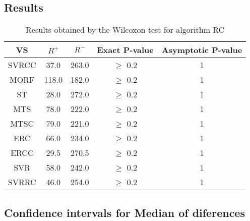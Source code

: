 \documentclass[a4paper,10pt]{article}
\begin{document}
\subsection{Results}

\begin{table}[!htp]
\centering\small
\begin{tabular}{
|c|c|c|c|c|}
\hline
 VS & $R^{+}$ & $R^{-}$ & Exact P-value & Asymptotic P-value \\ \hline 
SVRCC & 37.0 & 263.0 & $\geq$ 0.2 & 1\\ \hline 
MORF & 118.0 & 182.0 & $\geq$ 0.2 & 1\\ \hline 
ST & 28.0 & 272.0 & $\geq$ 0.2 & 1\\ \hline 
MTS & 78.0 & 222.0 & $\geq$ 0.2 & 1\\ \hline 
MTSC & 79.0 & 221.0 & $\geq$ 0.2 & 1\\ \hline 
ERC & 66.0 & 234.0 & $\geq$ 0.2 & 1\\ \hline 
ERCC & 29.5 & 270.5 & $\geq$ 0.2 & 1\\ \hline 
SVR & 58.0 & 242.0 & $\geq$ 0.2 & 1\\ \hline 
SVRRC & 46.0 & 254.0 & $\geq$ 0.2 & 1\\ \hline 

\end{tabular}
\caption{Results obtained by the Wilcoxon test for algorithm RC}
\end{table}

\subsection{Confidence intervals for Median of diferences}
\end{document}
